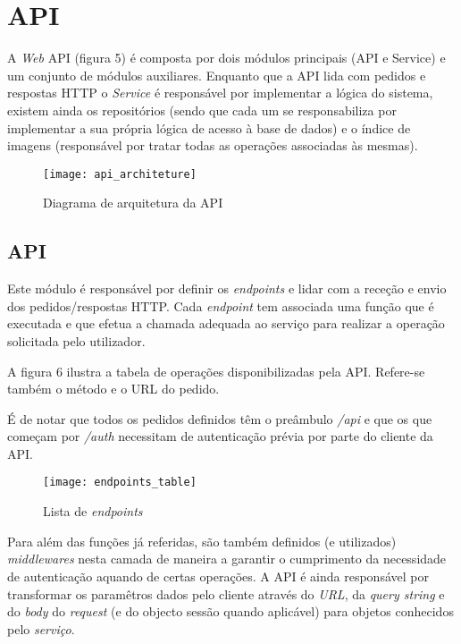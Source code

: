 \section{API}

A \textit{Web} API (figura 5) é composta por dois módulos principais (API e Service) e um conjunto de módulos auxiliares. Enquanto que a API lida com pedidos e respostas HTTP o \textit{Service} é responsável por implementar a lógica do sistema, existem ainda os repositórios (sendo que cada um se responsabiliza por implementar a sua própria lógica de acesso à base de dados) e o índice de imagens (responsável por tratar todas as operações associadas às mesmas).

\begin{figure}[h]
	\centering
	\texttt{[image: api\_architeture]}
	\caption{Diagrama de arquitetura da API}
\end{figure}

\subsection{API}
Este módulo é responsável por definir os \textit{endpoints} e lidar com a receção e envio dos pedidos/respostas HTTP. Cada \textit{endpoint} tem associada uma função que é executada e que efetua a chamada adequada ao serviço para realizar a operação solicitada pelo utilizador. \par \medskip

A figura 6 ilustra a tabela de operações disponibilizadas pela API. Refere-se também o método e o URL do pedido.	 \par \medskip

É de notar que todos os pedidos definidos têm o preâmbulo \textit{/api} e que os que começam por \textit{/auth} necessitam de autenticação prévia por parte do cliente da API. \par \medskip

\newpage

\begin{figure}[h]
	\centering
	\texttt{[image: endpoints\_table]}
	\caption{Lista de \textit{endpoints}}
\end{figure}

Para além das funções já referidas, são também definidos (e utilizados) \textit{middlewares} nesta camada de maneira a garantir o cumprimento da necessidade de autenticação aquando de certas operações. A API é ainda responsável por transformar os paramêtros dados pelo cliente através do \textit{URL}, da \textit{query string} e do \textit{body} do \textit{request} (e do objecto sessão quando aplicável) para objetos conhecidos pelo \textit{serviço}. \medskip

